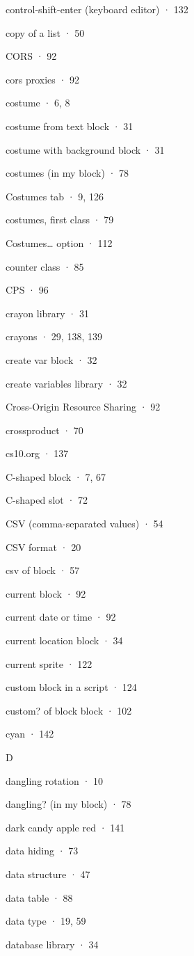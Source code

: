 \documentclass[
  letterpaper,
]{book}
\begin{document}
control-shift-enter (keyboard editor) · 132

copy of a list · 50

CORS · 92

cors proxies · 92

costume · 6, 8

costume from text block · 31

costume with background block · 31

costumes (in my block) · 78

Costumes tab · 9, 126

costumes, first class · 79

Costumes\ldots{} option · 112

counter class · 85

CPS · 96

crayon library · 31

crayons · 29, 138, 139

create var block · 32

create variables library · 32

Cross-Origin Resource Sharing · 92

crossproduct · 70

cs10.org · 137

C-shaped block · 7, 67

C-shaped slot · 72

CSV (comma-separated values) · 54

CSV format · 20

csv of block · 57

current block · 92

current date or time · 92

current location block · 34

current sprite · 122

custom block in a script · 124

custom? of block block · 102

cyan · 142

D

dangling rotation · 10

dangling? (in my block) · 78

dark candy apple red · 141

data hiding · 73

data structure · 47

data table · 88

data type · 19, 59

database library · 34
\end{document}

